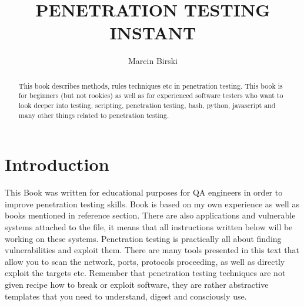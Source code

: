 \documentclass{article}[12pt]
\title{\huge{PENETRATION TESTING INSTANT}}
\author{Marcin Birski}
\begin{document}
\begin{center}
\maketitle
\newpage
\end{center}

\begin{abstract}

This book describes methods, rules techniques etc in penetration testing.
    This book is for beginners (but not rookies) as well as for experienced software testers who want to look deeper into testing, scripting, penetration testing, bash, python, javascript and many other things related to penetration testing.
\end{abstract}


\tableofcontents
\newpage





\section{Introduction}
This Book was written for educational purposes for QA engineers in order to improve penetration testing skills.
Book is based on my own experience as well as books mentioned in reference section.
There are also applications and vulnerable systems attached to the file, it means that all instructions written below will be working on these systems.
Penetration testing is practically all about finding vulnerabilities and exploit them.
There are many tools presented in this text that allow you to scan the network, ports, protocols proceeding, as well as directly exploit the targets etc.
Remember that penetration testing techniques are not given recipe how to break or exploit software, they are rather abstractive templates that you need to understand, digest and consciously use.
\end{document}
